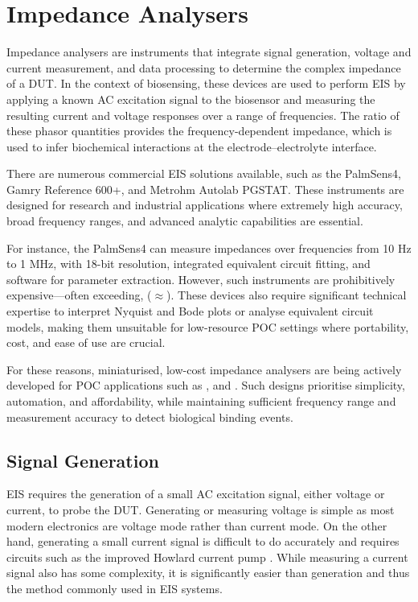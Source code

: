 \section{Impedance Analysers}
Impedance analysers are instruments that integrate signal generation, voltage and current measurement, and data processing to determine the complex impedance of a \ac{DUT}. In the context of biosensing, these devices are used to perform \ac{EIS} by applying a known AC excitation signal to the biosensor and measuring the resulting current and voltage responses over a range of frequencies. The ratio of these phasor quantities provides the frequency-dependent impedance, which is used to infer biochemical interactions at the electrode–electrolyte interface.

There are numerous commercial EIS solutions available, such as the PalmSens4, Gamry Reference 600+, and Metrohm Autolab PGSTAT. These instruments are designed for research and industrial applications where extremely high accuracy, broad frequency ranges, and advanced analytic capabilities are essential.

For instance, the PalmSens4 can measure impedances over frequencies from 10 Hz to 1 MHz, with 18-bit resolution, integrated equivalent circuit fitting, and software for parameter extraction. However, such instruments are prohibitively expensive—often exceeding, ($\approx$). These devices also require significant technical expertise to interpret Nyquist and Bode plots or analyse equivalent circuit models, making them unsuitable for low-resource POC settings where portability, cost, and ease of use are crucial.

For these reasons, miniaturised, low-cost impedance analysers are being actively developed for POC applications such as \cite{buscagliaSimpleZLowCostPortable2023}, \cite{al-aliDesignPortableLowCost2017} and \cite{ibrahimCMOSTransimpedanceAmplifier}. Such designs prioritise simplicity, automation, and affordability, while maintaining sufficient frequency range and measurement accuracy to detect biological binding events.

\subsection{Signal Generation}
\Ac{EIS} requires the generation of a small AC excitation signal, either voltage or current, to probe the \ac{DUT}. Generating or measuring voltage is simple as most modern electronics are voltage mode rather than current mode. On the other hand, generating a small current signal is difficult to do accurately and requires circuits such as the improved Howlard current pump \cite{ImprovedHowlandCurrent2020}. While measuring a current signal also has some complexity, it is significantly easier than generation and thus the method commonly used in \ac{EIS} systems.

